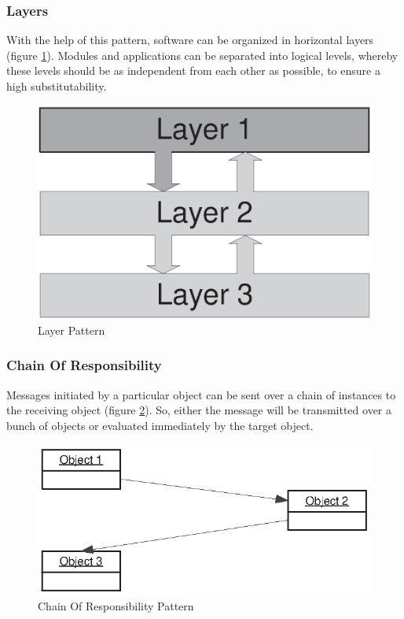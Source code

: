 \subsubsection{Layers}
\label{layers_heading}

With the help of this pattern, software can be organized in horizontal layers
(figure \ref{layer_figure}). Modules and applications can be separated into logical
levels, whereby these levels should be as independent from each other as possible,
to ensure a high substitutability.

\begin{figure}[ht]
    \begin{center}
       \includegraphics[scale=0.5]{eps/3-Tier-1.eps}
       \caption{Layer Pattern}
       \label{layer_figure}
    \end{center}
\end{figure}

\subsubsection{Chain Of Responsibility}
\label{chain_of_responsibility_heading}

Messages initiated by a particular object can be sent over a chain of instances
to the receiving object (figure \ref{chain_of_responsibility_figure}). So, either
the message will be transmitted over a bunch of objects or evaluated immediately
by the target object.

\begin{figure}[ht]
    \begin{center}
       \includegraphics[scale=0.8]{eps/chain.eps}
       \caption{Chain Of Responsibility Pattern}
       \label{chain_of_responsibility_figure}
    \end{center}
\end{figure}

